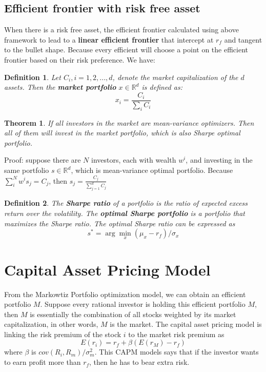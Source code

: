\documentclass[a4paper,13pt]{report}
\newcommand{\R}{\mathbb{R}}
\newtheorem{theorem}{Theorem}[section]
\newtheorem*{definition}{Definition}
\begin{document}
\subsection{Efficient frontier with risk free asset}
When there is a risk free asset, the efficient frontier calculated using above framework to lead to a \textbf{linear efficient frontier} that intercept at $r_f$ and tangent to the bullet shape. Because every efficient will choose a point on the efficient frontier based on their risk preference. We have:

\begin{definition}
Let $C_i, i=1,2,...,d$, denote the market capitalization of the $d$ assets. Then the \textbf{market portfolio} $x \in \R^d$ is defined as:
$$x_i = \frac{C_i}{\sum_{i}C_i}$$
\end{definition}

\begin{theorem}
If all investors in the market are mean-variance optimizers. Then all of them will invest in the market portfolio, which is also Sharpe optimal portfolio.
\end{theorem}
Proof: suppose there are $N$ investors, each with wealth $w^i$, and investing in the same portfolio $s \in \R^d$, which is mean-variance optimal portfolio. Because $\sum_{i}^N w^i s_j = C_j$, then $s_j = \frac{C_j}{\sum_{j=1}^d C_j}$


\begin{definition}
The \textbf{Sharpe ratio} of a portfolio is the ratio of expected excess return over the volatility. The \textbf{optimal Sharpe portfolio} is a portfolio that maximizes the Sharpe ratio. The optimal Sharpe ratio can be expressed as
$$s^* = \arg\min_{x} (\mu_x - r_f)/\sigma_x$$
\end{definition}


\section{Capital Asset Pricing Model}
From the Markowtiz Portfolio optimization model, we can obtain an efficient portfolio $M$. Suppose every rational investor is holding this efficient portfolio $M$, then $M$ is essentially the combination of all stocks weighted by its market capitalization, in other words, $M$ is the market.  The capital asset pricing model is linking the risk premium of the stock $i$ to the market risk premium as $$E(r_i) = r_f + \beta (E(r_M) - r_f)$$
where $\beta$ is $cov(R_i,R_m)/\sigma^2_m$. This CAPM models says that if the investor wants to earn profit more than $r_f$, then he has to bear extra risk.
\end{document}
